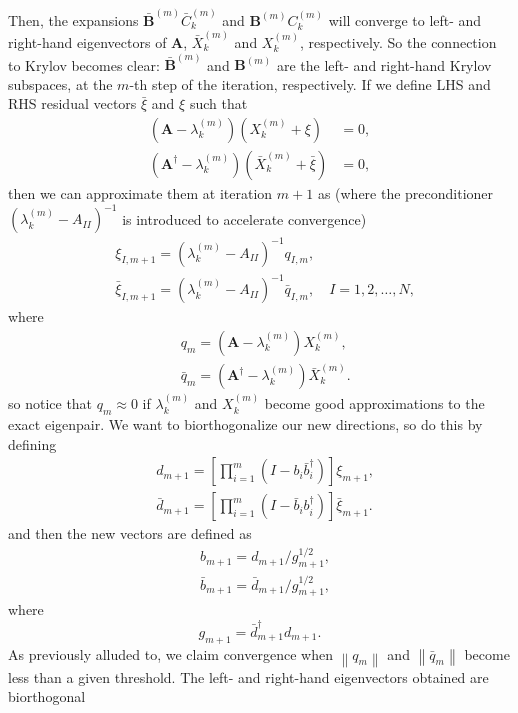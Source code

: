 Then, the expansions $\bm{\bar{B}}^{(m)} \bar{C}_k^{(m)}$ and $\bm{B}^{(m)} C_k^{(m)}$ will converge to left- and right-hand eigenvectors of $\bm{A}$, $\bar{X}_k^{(m)}$ and $X_k^{(m)}$, respectively. So the connection to Krylov becomes clear: $\bm{\bar{B}}^{(m)}$ and $\bm{B}^{(m)}$ are the left- and right-hand Krylov subspaces, at the $m$-th step of the iteration, respectively. If we define LHS and RHS residual vectors $\bar{\xi}$ and $\xi$ such that
\begin{align}
\left(\bm{A} - \lambda_k^{(m)}\right)  \left(X_k^{(m)} + \xi\right)& = 0, \\
\left(\bm{A}^\dag - \lambda_k^{(m)}\right) \left(\bar{X}_k^{(m)} + \bar{\xi}\right) & = 0,
\end{align}
then we can approximate them at iteration $m+1$ as (where the preconditioner $\left(\lambda_k^{(m)} - A_{II}\right)^{-1}$ is introduced to accelerate convergence)
\begin{align}
    & \xi_{I, m+1}=\left(\lambda_{k}^{(m)}-A_{I I}\right)^{-1} q_{I, m}, \\
    & \bar{\xi}_{I, m+1}=\left(\lambda_{k}^{(m)}-A_{I I}\right)^{-1} \bar{q}_{I, m}, \quad I=1,2, \ldots, N,
\end{align}
where
\begin{align}
    & q_m=\left(\bm{A}-\lambda_{k}^{(m)}\right) X_k^{(m)}, \\
    & \bar{q}_m=\left(\bm{A}^\dag-\lambda_{k}^{(m)}\right) \bar{X}_k^{(m)}.
\end{align}
so notice that $q_m\approx 0$ if $\lambda_k^{(m)}$ and $X_k^{(m)}$ become good approximations to the exact eigenpair. We want to biorthogonalize our new directions, so do this by defining
\begin{align}
    & d_{m+1}=\left[\prod_{i=1}^m\left(I-b_i \bar{b}_i^\dag\right)\right] \xi_{m+1}, \\
    & \bar{d}_{m+1}=\left[\prod_{i=1}^m\left(I-\bar{b}_i b_i^\dag\right)\right] \bar{\xi}_{m+1}.
\end{align} 
and then the new vectors are defined as
\begin{align}
    & b_{m+1}=d_{m+1} / g_{m+1}^{1 / 2}, \\
    & \bar{b}_{m+1}=\bar{d}_{m+1} / g_{m+1}^{1 / 2},
\end{align}
where
\begin{equation}
g_{m+1}=\bar{d}_{m+1}^\dag d_{m+1}.
\end{equation}
As previously alluded to, we claim convergence when $\left\|q_m\right\|$ and $\left\|\bar{q}_m\right\|$ become less than a given threshold. The left- and right-hand eigenvectors obtained are biorthogonal

